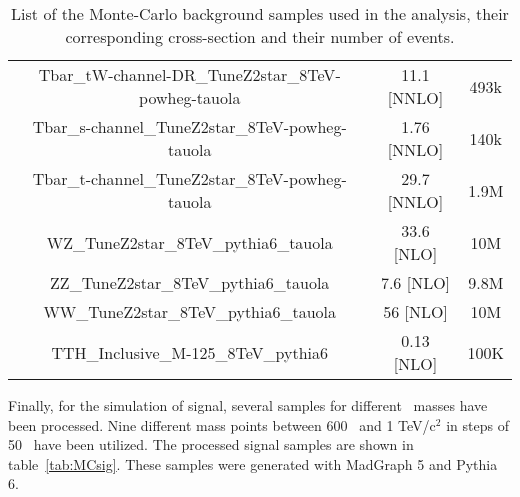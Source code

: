 \begin{table*}[htbH]
\begin{center}
{\begin{tabular}{|c|c|c|}
Tbar\_tW-channel-DR\_TuneZ2star\_8TeV-powheg-tauola & 11.1 [NNLO] & 493k\\
Tbar\_s-channel\_TuneZ2star\_8TeV-powheg-tauola & 1.76 [NNLO] & 140k\\
Tbar\_t-channel\_TuneZ2star\_8TeV-powheg-tauola & 29.7 [NNLO] & 1.9M\\
WZ\_TuneZ2star\_8TeV\_pythia6\_tauola & 33.6 [NLO] & 10M\\
ZZ\_TuneZ2star\_8TeV\_pythia6\_tauola & 7.6 [NLO] & 9.8M\\
WW\_TuneZ2star\_8TeV\_pythia6\_tauola & 56 [NLO] & 10M\\
TTH\_Inclusive\_M-125\_8TeV\_pythia6 & 0.13 [NLO] & 100K\\
\hline
\end{tabular}
}
\caption{List of the Monte-Carlo background samples used in the analysis, their corresponding cross-section and their number of events.\label{tab:MCbkg}}
\end{center}
\end{table*}

Finally, for the simulation of signal, several samples for different \Tp~masses have been processed. Nine different mass points between 600 \GeVcc~and 1 TeV/$\text{c}^{2}$ in steps of 50 \GeVcc~have been utilized. The processed signal samples are shown in table~\ref{tab:MCsig}. These samples were generated with MadGraph 5 and Pythia 6.

\begin{table*}[htbH]
\begin{center}
\caption{List of Monte-Carlo signal samples used in the analysis, their corresponding cross-section and \Tp~mass.\label{tab:MCsig}}
\end{center}
\end{table*}

